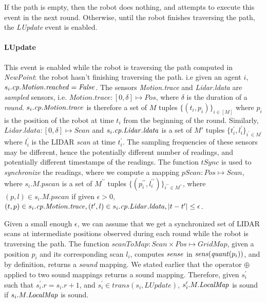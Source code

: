 If the path is empty, then the robot does nothing, and attempts to execute this event in the next round. Otherwise, until the robot finishes traversing the path, the \emph{LUpdate} event is enabled.

\paragraph{LUpdate}
This event is enabled while the robot is traversing the path computed in \emph{NewPoint}: the robot hasn't finishing traversing the path. i.e given an agent $i$, $s_i.\mathit{cp}.\mathit{Motion.reached}  = \mathit{False}$. The sensors \emph{Motion.trace} and \emph{Lidar.ldata} are \emph{sampled} sensors, i.e. $\mathit{Motion.trace}: [0,\delta] \mapsto \mathit{Pos}$, where $\delta$ is the duration of a \emph{round}. $s_i.\mathit{cp}.\mathit{Motion.trace}$ is therefore a set of $M$ tuples $\{(t_i, p_i)\}_{i \in [M]}$ where $p_i$ is the position of the robot at time $t_i$ from the beginning of the round. Similarly, $\mathit{Lidar.ldata} : [0,\delta]\mapsto \mathit{Scan}$ and $s_i.\mathit{cp}.\mathit{Lidar.ldata}$ is a set of $M'$ tuples $\{t_i^\prime, l_i^\prime\}_{i^\prime \in M^\prime}$ where $l_i^\prime$ is the LIDAR \emph{scan} at time $t_i^\prime$. The sampling frequencies of these sensors may be different, hence the potentially different number of readings, and potentially different timestamps of the readings. The function $\mathit{tSync}$ is used to \emph{synchronize} the readings, where we compute a mapping $\mathit{pScan}: \mathit{Pos} \mapsto \mathit{Scan}$, where $s_i.M.\mathit{pscan}$ is a set of $M^{\prime\prime}$ tuples $\{(p_i^{\prime\prime}, l_i^{\prime\prime})\}_{i^{\prime\prime} \in M ^{\prime\prime}}$, where  $(p, l) \in s_i.M.\mathit{pscan}$ if given $\epsilon > 0$,  $(t,p) \in s_i.\mathit{cp}.\mathit{Motion.trace}, (t^\prime,l )\in s_i.\mathit{cp}.\mathit{Lidar.ldata}, |t - t^\prime| \leq \epsilon$.

Given a small enough $\epsilon$, we can assume that we get a synchronized set of LIDAR scans at intermediate positions observed during each round while the robot is traversing the path.  The function $\mathit{scanToMap}: \mathit{Scan} \times \mathit{Pos}\mapsto \mathit{GridMap}$, given a position $p_i$ and its corresponding scan $l_i$, computes $\mathit{sense}$ in $\mathit{sens}(\mathit{quant}(p_i))$, and by definition, returns a \emph{sound} mapping. We stated earlier that the operator $\oplus$ applied to two sound mappings returns a sound mapping. Therefore, given $s_i^\prime$ such that $s_i^\prime.r = s_i.r + 1$, and $\mathit{s_i^\prime \in \mathit{trans}(s_i,\mathit{LUpdate})}$,  $s_i^\prime.M.\mathit{LocalMap}$ is sound if $s_i.M.\mathit{LocalMap}$ is sound.


